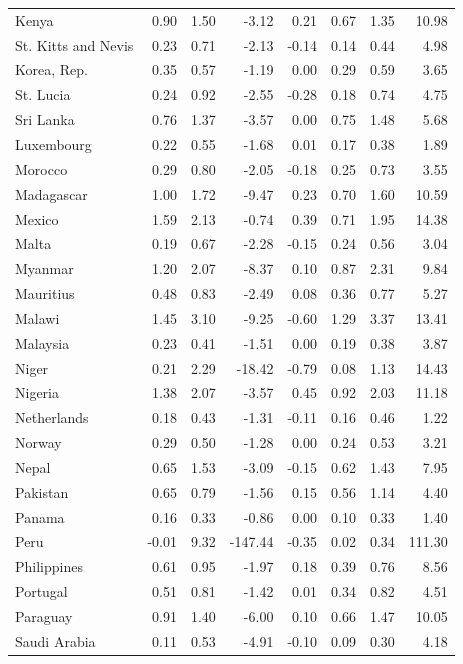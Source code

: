 \begin{longtable}{lrrrrrrr}
Kenya & 0.90 & 1.50 & -3.12 & 0.21 & 0.67 & 1.35 & 10.98 \\
St. Kitts and Nevis & 0.23 & 0.71 & -2.13 & -0.14 & 0.14 & 0.44 & 4.98 \\
Korea, Rep. & 0.35 & 0.57 & -1.19 & 0.00 & 0.29 & 0.59 & 3.65 \\
St. Lucia & 0.24 & 0.92 & -2.55 & -0.28 & 0.18 & 0.74 & 4.75 \\
Sri Lanka & 0.76 & 1.37 & -3.57 & 0.00 & 0.75 & 1.48 & 5.68 \\
Luxembourg & 0.22 & 0.55 & -1.68 & 0.01 & 0.17 & 0.38 & 1.89 \\
Morocco & 0.29 & 0.80 & -2.05 & -0.18 & 0.25 & 0.73 & 3.55 \\
Madagascar & 1.00 & 1.72 & -9.47 & 0.23 & 0.70 & 1.60 & 10.59 \\
Mexico & 1.59 & 2.13 & -0.74 & 0.39 & 0.71 & 1.95 & 14.38 \\
Malta & 0.19 & 0.67 & -2.28 & -0.15 & 0.24 & 0.56 & 3.04 \\
Myanmar & 1.20 & 2.07 & -8.37 & 0.10 & 0.87 & 2.31 & 9.84 \\
Mauritius & 0.48 & 0.83 & -2.49 & 0.08 & 0.36 & 0.77 & 5.27 \\
Malawi & 1.45 & 3.10 & -9.25 & -0.60 & 1.29 & 3.37 & 13.41 \\
Malaysia & 0.23 & 0.41 & -1.51 & 0.00 & 0.19 & 0.38 & 3.87 \\
Niger & 0.21 & 2.29 & -18.42 & -0.79 & 0.08 & 1.13 & 14.43 \\
Nigeria & 1.38 & 2.07 & -3.57 & 0.45 & 0.92 & 2.03 & 11.18 \\
Netherlands & 0.18 & 0.43 & -1.31 & -0.11 & 0.16 & 0.46 & 1.22 \\
Norway & 0.29 & 0.50 & -1.28 & 0.00 & 0.24 & 0.53 & 3.21 \\
Nepal & 0.65 & 1.53 & -3.09 & -0.15 & 0.62 & 1.43 & 7.95 \\
Pakistan & 0.65 & 0.79 & -1.56 & 0.15 & 0.56 & 1.14 & 4.40 \\
Panama & 0.16 & 0.33 & -0.86 & 0.00 & 0.10 & 0.33 & 1.40 \\
Peru & -0.01 & 9.32 & -147.44 & -0.35 & 0.02 & 0.34 & 111.30 \\
Philippines & 0.61 & 0.95 & -1.97 & 0.18 & 0.39 & 0.76 & 8.56 \\
Portugal & 0.51 & 0.81 & -1.42 & 0.01 & 0.34 & 0.82 & 4.51 \\
Paraguay & 0.91 & 1.40 & -6.00 & 0.10 & 0.66 & 1.47 & 10.05 \\
Saudi Arabia & 0.11 & 0.53 & -4.91 & -0.10 & 0.09 & 0.30 & 4.18 \\

\end{longtable}
